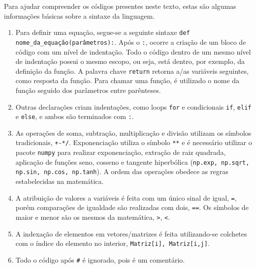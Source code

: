 \begin{apendicesenv}
Para ajudar compreender os códigos presentes neste texto, estas são algumas informações básicas sobre a sintaxe da linguagem.

\begin{enumerate}
	\item 	Para definir uma equação, segue-se a seguinte sintaxe \texttt{def nome_da_equação(parâmetros):}. Após o \texttt{:}, ocorre a criação de um bloco de código com um nível de indentação. Todo o código dentro de um mesmo nível de indentação possui o mesmo escopo, ou seja, está dentro, por exemplo, da definição da função. A palavra chave \texttt{return} retorna a/as variáveis seguintes, como resposta da função. Para chamar uma função, é utilizado o nome da função seguido dos parâmetros entre parênteses.
	
	\item  Outras declarações criam indentações, como loops \texttt{for} e condicionais \texttt{if}, \texttt{elif} e \texttt{else}, e ambos são terminados com \texttt{:}.
	
	\item 	As operações de soma, subtração, multiplicação e divisão utilizam os símbolos tradicionais, \texttt{+-*/}. Exponenciação utiliza o símbolo \texttt{**} e é necessário utilizar o pacote \texttt{numpy} para realizar exponenciação, extração de raiz quadrada, aplicação de funções seno, cosseno e tangente hiperbólica (\texttt{np.exp, np.sqrt, np.sin, np.cos, np.tanh}). A ordem das operações obedece as regras estabelecidas na matemática. 
	
	\item 	A atribuição de valores a variáveis é feita com um único sinal de igual, \texttt{=}, porém comparações de igualdade são realizadas com dois, \texttt{==}. Os símbolos de maior e menor são os mesmos da matemática, \texttt{>}, \texttt{<}.
	
	\item 	A indexação de elementos em vetores/matrizes é feita utilizando-se colchetes com o índice do elemento no interior, \texttt{Matriz[i], Matriz[i,j]}.
	
	\item Todo o código após \texttt{#} é ignorado, pois é um comentário.
	
\end{enumerate}

\end{apendicesenv}

